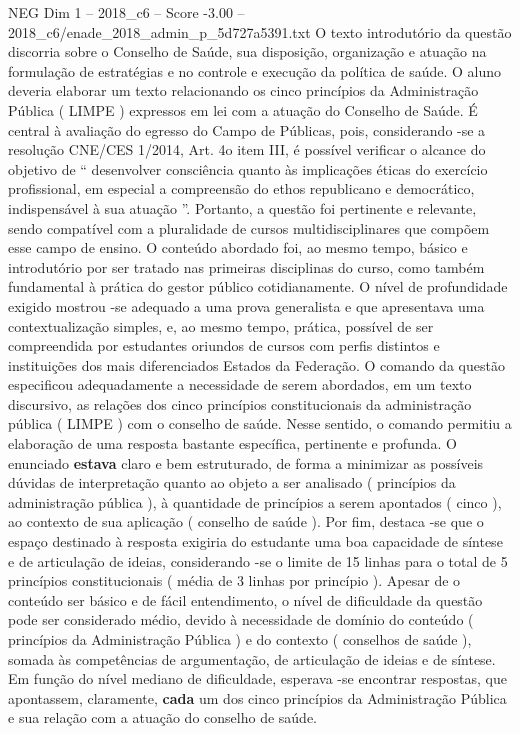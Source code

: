 \begin{textsample}{NEG Dim 1 – 2018\_c6 – Score -3.00 – 2018\_c6/enade\_2018\_admin\_p\_5d727a5391.txt}
O texto introdutório da questão discorria sobre o Conselho de Saúde, sua disposição, organização e atuação na formulação de estratégias e no controle e execução da política de saúde.
O aluno deveria elaborar um texto relacionando os cinco princípios da Administração Pública ( LIMPE ) expressos em lei com a atuação do Conselho de Saúde.
É central à avaliação do egresso do Campo de Públicas, pois, considerando -se a resolução CNE/CES 1/2014, Art. 4o item III, é possível verificar o alcance do objetivo de “ desenvolver consciência quanto às implicações éticas do exercício profissional, em especial a compreensão do ethos republicano e democrático, indispensável à sua atuação ”.
Portanto, a questão foi pertinente e relevante, sendo compatível com a pluralidade de cursos multidisciplinares que compõem esse campo de ensino.
O conteúdo abordado foi, ao mesmo tempo, básico e introdutório por ser tratado nas primeiras disciplinas do curso, como também fundamental à prática do gestor público cotidianamente.
O nível de profundidade exigido mostrou -se adequado a uma prova generalista e que apresentava uma contextualização simples, e, ao mesmo tempo, prática, possível de ser compreendida por estudantes oriundos de cursos com perfis distintos e instituições dos mais diferenciados Estados da Federação.
O comando da questão especificou adequadamente a necessidade de serem abordados, em um texto discursivo, as relações dos cinco princípios constitucionais da administração pública ( LIMPE ) com o conselho de saúde.
Nesse sentido, o comando permitiu a elaboração de uma resposta bastante específica, pertinente e profunda.
O enunciado \textbf{estava} claro e bem estruturado, de forma a minimizar as possíveis dúvidas de interpretação quanto ao objeto a ser analisado ( princípios da administração pública ), à quantidade de princípios a serem apontados ( cinco ), ao contexto de sua aplicação ( conselho de saúde ).
Por fim, destaca -se que o espaço destinado à resposta exigiria do estudante uma boa capacidade de síntese e de articulação de ideias, considerando -se o limite de 15 linhas para o total de 5 princípios constitucionais ( média de 3 linhas por princípio ).
Apesar de o conteúdo ser básico e de fácil entendimento, o nível de dificuldade da questão pode ser considerado médio, devido à necessidade de domínio do conteúdo ( princípios da Administração Pública ) e do contexto ( conselhos de saúde ), somada às competências de argumentação, de articulação de ideias e de síntese.
Em função do nível mediano de dificuldade, esperava -se encontrar respostas, que apontassem, claramente, \textbf{cada} um dos cinco princípios da Administração Pública e sua relação com a atuação do conselho de saúde.

\end{textsample}
